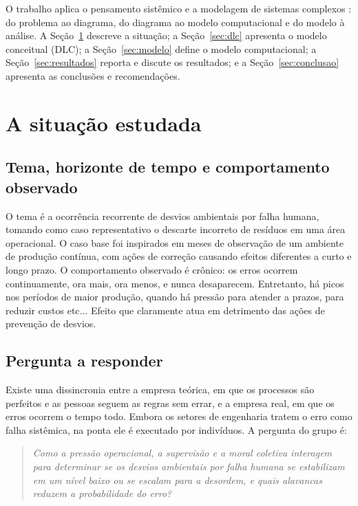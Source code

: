 \documentclass[11pt, a4paper]{article}
\begin{document}
O trabalho aplica o pensamento sistêmico \citep{meadows2022,sterman2000} e a modelagem de sistemas complexos \citep{sayama2015}: do problema ao diagrama, do diagrama ao modelo computacional e do modelo à análise. A Seção~\ref{sec:situacao} descreve a situação; a Seção~\ref{sec:dlc} apresenta o modelo conceitual (DLC); a Seção~\ref{sec:modelo} define o modelo computacional; a Seção~\ref{sec:resultados} reporta e discute os resultados; e a Seção~\ref{sec:conclusao} apresenta as conclusões e recomendações.

\section{A situação estudada}\label{sec:situacao}

\subsection{Tema, horizonte de tempo e comportamento observado}\label{sec:comportamento}
O tema é a ocorrência recorrente de desvios ambientais por falha humana, tomando como caso representativo o descarte incorreto de resíduos em uma área operacional. O caso base foi inspirados em meses de observação de um ambiente de produção contínua, com ações de correção causando efeitos diferentes a curto e longo prazo. O comportamento observado é crônico: os erros ocorrem continuamente, ora mais, ora menos, e nunca desaparecem. Entretanto, há picos nos períodos de maior produção, quando há pressão para atender a prazos, para reduzir custos etc... Efeito que claramente atua em detrimento das ações de prevenção de desvios.

\subsection{Pergunta a responder}
Existe uma dissincronia entre a empresa teórica, em que os processos são perfeitos e as pessoas seguem as regras sem errar, e a empresa real, em que os erros ocorrem o tempo todo. Embora os setores de engenharia tratem o erro como falha sistêmica, na ponta ele é executado por indivíduos. A pergunta do grupo é:
\begin{quote}
\emph{Como a pressão operacional, a supervisão e a moral coletiva interagem para determinar se os desvios ambientais por falha humana se estabilizam em um nível baixo ou se escalam para a desordem, e quais alavancas reduzem a probabilidade do erro?}
\end{quote}
\end{document}

